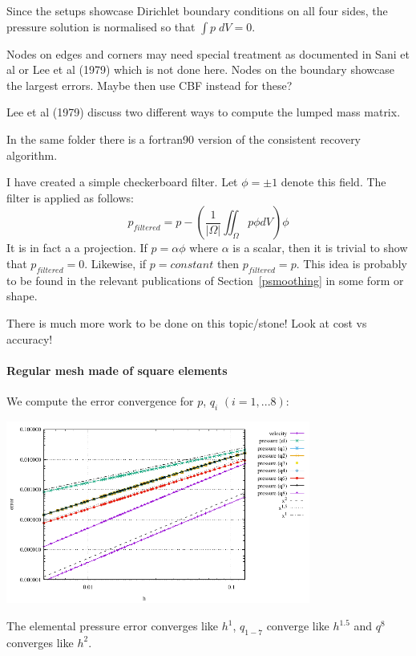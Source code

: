 Since the setups showcase Dirichlet boundary conditions on all four sides, 
the pressure solution is normalised so that $\int p\; dV =0 $.

\begin{remark}
Nodes on edges and corners may need special treatment as documented in Sani et al \cite{sagl81a} or
Lee et al (1979) \cite{legs79} which is not done here.  
Nodes on the boundary showcase the largest errors. Maybe then use CBF instead for these?
\end{remark}

\begin{remark}
Lee et al (1979) \cite{legs79} discuss two different ways to compute the lumped mass matrix. 
\end{remark}

\begin{remark}
In the same folder there is a fortran90 version of the consistent recovery algorithm.
\end{remark}

I have created a simple checkerboard filter. Let $\phi=\pm 1$ denote this field.
The filter is applied as follows:
\[
p_{filtered} = p - \left( \frac{1}{|\Omega|} \iint_\Omega p \phi dV \right) \phi
\]
It is in fact a a projection. If $p=\alpha \phi$  where $\alpha$ is a scalar, then 
it is trivial to show that $p_{filtered} =0$.
Likewise, if $p=constant$ then $p_{filtered}=p$.
This idea is probably to be found in the relevant publications of Section~\ref{psmoothing}
in some form or shape. 

There is much more work to be done on this topic/stone! Look at cost vs accuracy!

\newpage
\paragraph{Regular mesh made of square elements}

We compute the error convergence for $p$, $q_i$ $(i=1,...8)$:
\begin{center}
\includegraphics[width=10cm]{python_codes/fieldstone_12/results/reg/errors}
\end{center}
The elemental pressure error converges like $h^1$, $q_{1-7}$ converge like $h^{1.5}$ and 
$q^8$ converges like $h^2$.


